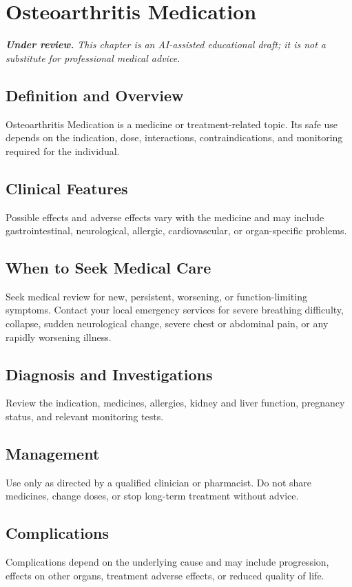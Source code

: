 \chapter{Osteoarthritis Medication}

\medskip
\noindent\textit{\textbf{Under review.} This chapter is an AI-assisted educational draft; it is not a substitute for professional medical advice.}

\section*{Definition and Overview}
Osteoarthritis Medication is a medicine or treatment-related topic. Its safe use depends on the indication, dose, interactions, contraindications, and monitoring required for the individual.

\section*{Clinical Features}
Possible effects and adverse effects vary with the medicine and may include gastrointestinal, neurological, allergic, cardiovascular, or organ-specific problems.

\section*{When to Seek Medical Care}
Seek medical review for new, persistent, worsening, or function-limiting symptoms. Contact your local emergency services for severe breathing difficulty, collapse, sudden neurological change, severe chest or abdominal pain, or any rapidly worsening illness.

\section*{Diagnosis and Investigations}
Review the indication, medicines, allergies, kidney and liver function, pregnancy status, and relevant monitoring tests.

\section*{Management}
Use only as directed by a qualified clinician or pharmacist. Do not share medicines, change doses, or stop long-term treatment without advice.

\section*{Complications}
Complications depend on the underlying cause and may include progression, effects on other organs, treatment adverse effects, or reduced quality of life.

